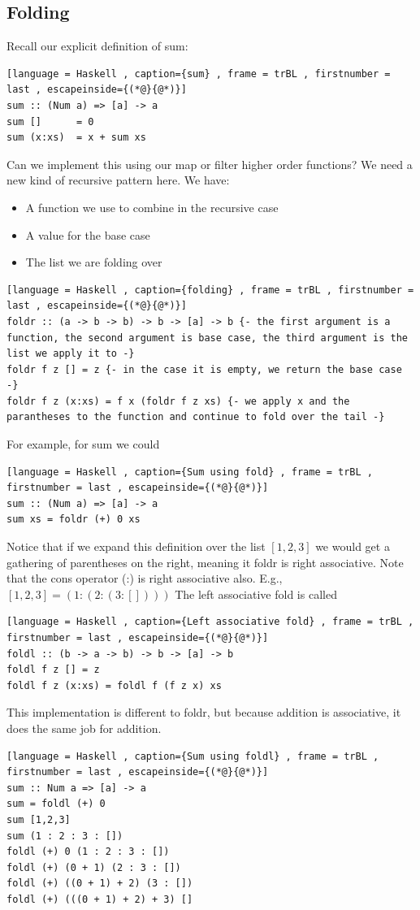\documentclass[a4paper]{article}
\theoremstyle{plain}
\theoremstyle{definition}
\theoremstyle{remark}
\begin{document}
\subsection{Folding}
Recall our explicit definition of sum:
\begin{lstlisting}[language = Haskell , caption={sum} , frame = trBL , firstnumber = last , escapeinside={(*@}{@*)}]
sum :: (Num a) => [a] -> a
sum []		= 0
sum (x:xs)	= x + sum xs
\end{lstlisting}
Can we implement this using our map or filter higher order functions? We need a new kind of recursive pattern here.
We have:
\begin{itemize}
	\item A function we use to combine in the recursive case
	\item A value for the base case
	\item The list we are folding over
\end{itemize}
\begin{lstlisting}[language = Haskell , caption={folding} , frame = trBL , firstnumber = last , escapeinside={(*@}{@*)}]
foldr :: (a -> b -> b) -> b -> [a] -> b {- the first argument is a function, the second argument is base case, the third argument is the list we apply it to -}
foldr f z [] = z {- in the case it is empty, we return the base case -}
foldr f z (x:xs) = f x (foldr f z xs) {- we apply x and the parantheses to the function and continue to fold over the tail -} 
\end{lstlisting}
For example, for sum we could
\begin{lstlisting}[language = Haskell , caption={Sum using fold} , frame = trBL , firstnumber = last , escapeinside={(*@}{@*)}]
sum :: (Num a) => [a] -> a
sum xs = foldr (+) 0 xs
\end{lstlisting}
Notice that if we expand this definition over the list $[1,2,3]$ we would get a gathering of parentheses on the right, meaning it foldr is right associative. Note that the cons operator (:) is right associative also. E.g., $[1,2,3] = (1 : (2:(3:[])))$ The left associative fold is called
\begin{lstlisting}[language = Haskell , caption={Left associative fold} , frame = trBL , firstnumber = last , escapeinside={(*@}{@*)}]
foldl :: (b -> a -> b) -> b -> [a] -> b
foldl f z [] = z
foldl f z (x:xs) = foldl f (f z x) xs
\end{lstlisting}
This implementation is different to foldr, but because addition is associative, it does the same job for addition.
\begin{lstlisting}[language = Haskell , caption={Sum using foldl} , frame = trBL , firstnumber = last , escapeinside={(*@}{@*)}]
sum :: Num a => [a] -> a
sum = foldl (+) 0
sum [1,2,3]
sum (1 : 2 : 3 : [])
foldl (+) 0 (1 : 2 : 3 : [])
foldl (+) (0 + 1) (2 : 3 : [])
foldl (+) ((0 + 1) + 2) (3 : [])
foldl (+) (((0 + 1) + 2) + 3) []
\end{lstlisting}
\end{document}
